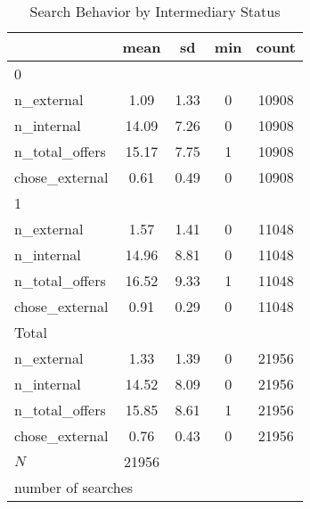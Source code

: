 \begin{table}[htbp]\centering
\def\sym#1{\ifmmode^{#1}\else\(^{#1}\)\fi}
\caption{Search Behavior by Intermediary Status}
\begin{tabular}{l*{1}{cccc}}
\hline\hline
            &        mean&          sd&         min&       count\\
\hline
0           &            &            &            &            \\
n\_external  &        1.09&        1.33&           0&       10908\\
n\_internal  &       14.09&        7.26&           0&       10908\\
n\_total\_offers&       15.17&        7.75&           1&       10908\\
chose\_external&        0.61&        0.49&           0&       10908\\
\hline
1           &            &            &            &            \\
n\_external  &        1.57&        1.41&           0&       11048\\
n\_internal  &       14.96&        8.81&           0&       11048\\
n\_total\_offers&       16.52&        9.33&           1&       11048\\
chose\_external&        0.91&        0.29&           0&       11048\\
\hline
Total       &            &            &            &            \\
n\_external  &        1.33&        1.39&           0&       21956\\
n\_internal  &       14.52&        8.09&           0&       21956\\
n\_total\_offers&       15.85&        8.61&           1&       21956\\
chose\_external&        0.76&        0.43&           0&       21956\\
\hline
\(N\)       &       21956&            &            &            \\
\hline\hline
\multicolumn{5}{l}{\footnotesize number of searches}\\
\end{tabular}
\end{table}
